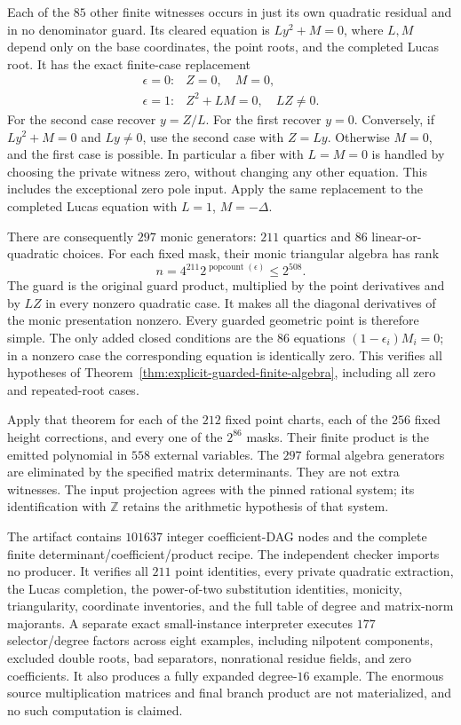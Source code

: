 \documentclass[11pt]{article}
\theoremstyle{definition}
\begin{document}
Each of the $85$ other finite witnesses occurs in just its own
quadratic residual and in no denominator guard. Its cleared equation
is $Ly^2+M=0$, where $L,M$ depend only on the base coordinates,
the point roots, and the completed Lucas root. It has the exact
finite-case replacement
\[
 \begin{array}{ll}
 \epsilon=0:& Z=0,\quad M=0,\\[2pt]
 \epsilon=1:& Z^2+LM=0,\quad LZ\ne0.
 \end{array}
\]
For the second case recover $y=Z/L$. For the first recover $y=0$.
Conversely, if $Ly^2+M=0$ and $Ly\ne0$, use the second case with
$Z=Ly$. Otherwise $M=0$, and the first case is possible. In
particular a fiber with $L=M=0$ is handled by choosing the private
witness zero, without changing any other equation. This includes
the exceptional zero pole input. Apply the same replacement to
the completed Lucas equation with $L=1$, $M=-\Delta$.

There are consequently $297$ monic generators: $211$ quartics
and $86$ linear-or-quadratic choices. For each fixed mask, their
monic triangular algebra has rank
\[
 n=4^{211}2^{\operatorname{popcount}(\epsilon)}\le2^{508}.
\]
The guard is the original guard product, multiplied by the point
derivatives and by $LZ$ in every nonzero quadratic case. It makes
all the diagonal derivatives of the monic presentation nonzero.
Every guarded geometric point is therefore simple. The only added
closed conditions are the $86$ equations
$(1-\epsilon_i)M_i=0$; in a nonzero case the corresponding equation
is identically zero. This verifies all hypotheses of
Theorem~\ref{thm:explicit-guarded-finite-algebra}, including all
zero and repeated-root cases.

Apply that theorem for each of the $212$ fixed point charts, each
of the $256$ fixed height corrections, and every one of the
$2^{86}$ masks. Their finite product is the emitted polynomial
in $558$ external variables. The $297$ formal algebra generators
are eliminated by the specified matrix determinants. They are not
extra witnesses. The input projection agrees with the pinned
rational system; its identification with $\mathbb Z$ retains the
arithmetic hypothesis of that system.

The artifact contains $101637$ integer coefficient-DAG nodes and
the complete finite determinant/coefficient/product recipe. The
independent checker imports no producer. It verifies all $211$
point identities, every private quadratic extraction, the Lucas
completion, the power-of-two substitution identities, monicity,
triangularity, coordinate inventories, and the full table of
degree and matrix-norm majorants. A separate exact small-instance
interpreter executes $177$ selector/degree factors across eight
examples, including nilpotent components, excluded double roots,
bad separators, nonrational residue fields, and zero coefficients.
It also produces a fully expanded degree-$16$ example. The enormous
source multiplication matrices and final branch product are not
materialized, and no such computation is claimed.
\end{document}
